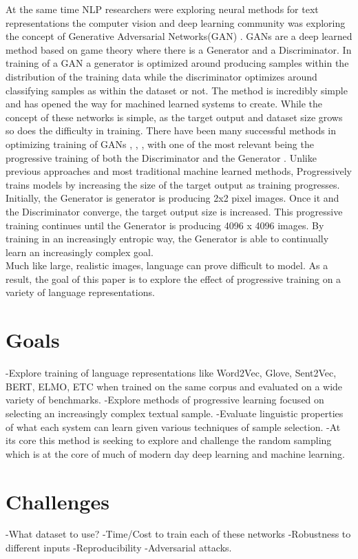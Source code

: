 \documentclass [11pt, proquest] {uwthesis}[2020/08/20]
\begin{document}
At the same time NLP researchers were exploring neural methods for text representations the computer vision and deep learning community was exploring the concept of Generative Adversarial Networks(GAN) \cite{}. GANs are a deep learned method based on game theory where there is a Generator and a Discriminator. In training of a GAN a generator is optimized around producing samples within the distribution of the training data while the discriminator optimizes around classifying samples as within the dataset or not. The method is incredibly simple and has opened the way for machined learned systems to create. While the concept of these networks is simple, as the target output and dataset size grows so does the difficulty in training. There have been many successful methods in optimizing training of GANs \cite{}, \cite{}, \cite{}, with one of the most relevant being the progressive training of both the Discriminator and the Generator \cite{}. Unlike previous approaches and most traditional machine learned methods, Progressively trains models by increasing the size of the target output as training progresses. Initially, the Generator is generator is producing 2x2 pixel images. Once it and the Discriminator converge, the target output size is increased. This progressive training continues until the Generator is producing 4096 x 4096 images. By training in an increasingly entropic way, the Generator is able to continually learn an increasingly complex goal. \\
Much like large, realistic images, language can prove difficult to model. As a result, the goal of this paper is to explore the effect of progressive training on a variety of language representations.
\section {Goals}
-Explore training of language representations like Word2Vec, Glove, Sent2Vec, BERT, ELMO, ETC when trained on the same corpus and evaluated on a wide variety of benchmarks.
-Explore methods of progressive learning focused on selecting an increasingly complex textual sample.
-Evaluate linguistic properties of what each system can learn given various techniques of sample selection.
-At its core this method is seeking to explore and challenge the random sampling which is at the core of much of modern day deep learning and machine learning. 
\section {Challenges}
-What dataset to use?
-Time/Cost to train each of these networks
-Robustness to different inputs
-Reproducibility
-Adversarial attacks.
\end{document}
